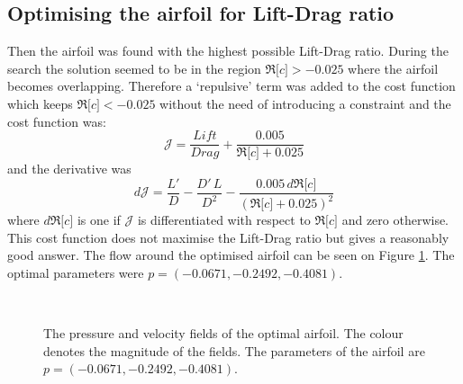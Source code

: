\documentclass[12pt, a4paper]{article}
\begin{document}
\subsection{Optimising the airfoil for Lift-Drag ratio}
Then the airfoil was found with the highest possible Lift-Drag ratio. During the search the solution seemed to be in the region $\Re \lbrack c \rbrack > -0.025$ where the airfoil becomes overlapping. Therefore a `repulsive' term was added to the cost function which keeps $\Re \lbrack c \rbrack < -0.025$ without the need of introducing a constraint and the cost function was:
\begin{equation}
\mathcal{J} = \frac{Lift}{Drag} + \frac{0.005}{\Re \lbrack c \rbrack + 0.025}
\end{equation}
and the derivative was
\begin{equation}
d \mathcal{J} = \frac{L'}{D} - \frac{D' \, L}{D^2} - \frac{0.005 \, d \Re \lbrack c \rbrack }{(\Re \lbrack c \rbrack + 0.025)^2}
\end{equation}
where $d \Re \lbrack c \rbrack$ is one if $\mathcal{J}$ is differentiated with respect to $\Re \lbrack c \rbrack$ and zero otherwise. This cost function does not maximise the Lift-Drag ratio but gives a reasonably good answer. The flow around the optimised airfoil can be seen on Figure \ref{fig_opt_joukow}. The optimal parameters were $p = (-0.0671,-0.2492,-0.4081)$.
\begin{figure}[htbp]
    \centering
     \\
    \caption{The pressure and velocity fields of the optimal airfoil. The colour denotes the magnitude of the fields. The parameters of the airfoil are $p = (-0.0671,-0.2492,-0.4081)$.}
    \label{fig_opt_joukow}
\end{figure}
\end{document}
